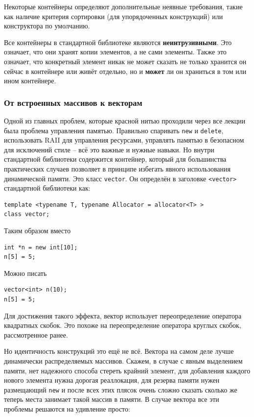 \documentclass[a4paper,12pt,oneside]{article}
\begin{document}
Некоторые контейнеры определяют дополнительные неявные требования, такие как наличие критерия сортировки (для упорядоченных конструкций) или конструктора по умолчанию.

Все контейнеры в стандартной библиотеке являются \textbf{неинтрузивными}. Это означает, что они хранят копии элементов, а не сами элементы. Также это означает, что конкретный элемент никак не может сказать не только хранится он сейчас в контейнере или живёт отдельно, но и \textbf{может} ли он храниться в том или ином контейнере.

\subsubsection{От встроенных массивов к векторам}\label{vectorarrs}

Одной из главных проблем, которые красной нитью проходили через все лекции была проблема управления памятью. Правильно спаривать \lstinline!new! и \lstinline!delete!, использовать RAII для управления ресурсами, управлять памятью в безопасном для исключений стиле -- всё это важные и нужные навыки. Но внутри стандартной библиотеки содержится контейнер, который для большинства практических случаев позволяет в принципе избегать явного использования динамической памяти. Это класс \lstinline!vector!. Он определён в заголовке \lstinline!<vector>! стандартной библиотеки как:

\begin{lstlisting}
template <typename T, typename Allocator = allocator<T> >
class vector;
\end{lstlisting}

Таким образом вместо

\begin{lstlisting}
int *n = new int[10];
n[5] = 5;
\end{lstlisting}

Можно писать

\begin{lstlisting}
vector<int> n(10);
n[5] = 5;
\end{lstlisting}

Для достижения такого эффекта, вектор использует переопределение оператора квадратных скобок. Это похоже на переопределение оператора круглых скобок, рассмотренное ранее.

Но идентичность конструкций это ещё не всё. Вектора на самом деле лучше динамически распределяемых массивов. Скажем, в случае с явным выделением памяти, нет надежного способа стереть крайний элемент, для добавления каждого нового элемента нужна дорогая реаллокация, для резерва памяти нужен размещающий \lstinline!new! и после всех этих плясок очень сложно сказать сколько же теперь места занимает такой массив в памяти. В случае вектора все эти проблемы решаются на удивление просто:
\end{document}
